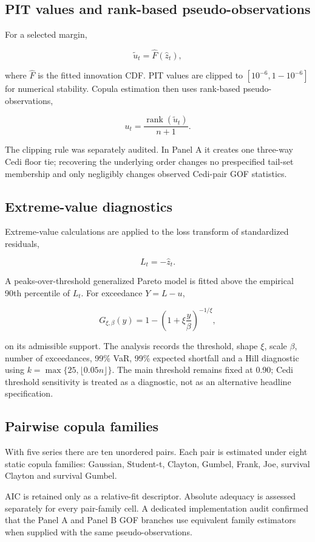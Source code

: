 \subsection{PIT values and rank-based pseudo-observations}

For a selected margin,

\[
\tilde u_t=\hat F(\hat z_t),
\]

where \(\hat F\) is the fitted innovation CDF. PIT values are clipped to \([10^{-6},1-10^{-6}]\) for numerical stability. Copula estimation then uses rank-based pseudo-observations,

\[
u_t=\frac{\operatorname{rank}(\tilde u_t)}{n+1}.
\]

The clipping rule was separately audited. In Panel A it creates one three-way Cedi floor tie; recovering the underlying order changes no prespecified tail-set membership and only negligibly changes observed Cedi-pair GOF statistics.

\subsection{Extreme-value diagnostics}

Extreme-value calculations are applied to the loss transform of standardized residuals,

\[
L_t=-\hat z_t.
\]

A peaks-over-threshold generalized Pareto model is fitted above the empirical 90th percentile of \(L_t\). For exceedance \(Y=L-u\),

\[
G_{\xi,\beta}(y)=1-\left(1+\xi\frac{y}{\beta}\right)^{-1/\xi},
\]

on its admissible support. The analysis records the threshold, shape \(\xi\), scale \(\beta\), number of exceedances, 99\% VaR, 99\% expected shortfall and a Hill diagnostic using \(k=\max\{25,\lfloor0.05n\rfloor\}\). The main threshold remains fixed at 0.90; Cedi threshold sensitivity is treated as a diagnostic, not as an alternative headline specification.

\subsection{Pairwise copula families}

With five series there are ten unordered pairs. Each pair is estimated under eight static copula families: Gaussian, Student-t, Clayton, Gumbel, Frank, Joe, survival Clayton and survival Gumbel.

AIC is retained only as a relative-fit descriptor. Absolute adequacy is assessed separately for every pair-family cell. A dedicated implementation audit confirmed that the Panel A and Panel B GOF branches use equivalent family estimators when supplied with the same pseudo-observations.

